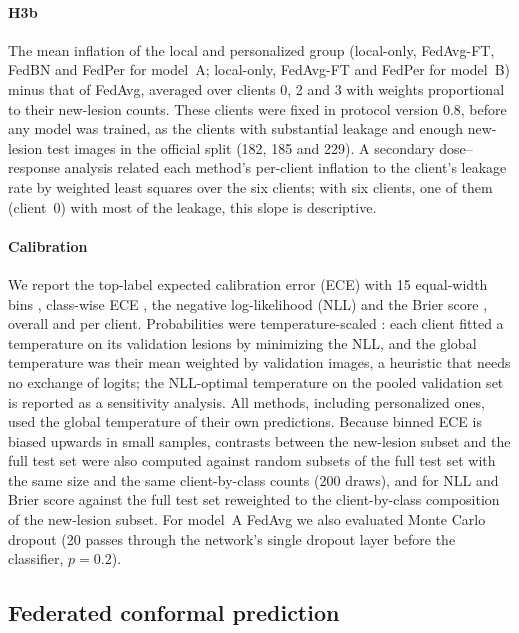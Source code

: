 \documentclass[VANCOUVER,Times1COL]{WileyNJDv5}
\begin{document}
\paragraph{H3b} The mean inflation of the local and personalized group (local-only, FedAvg-FT, FedBN
and FedPer for model~A; local-only, FedAvg-FT and FedPer for model~B) minus that of FedAvg, averaged over
clients 0, 2 and 3 with weights proportional to their new-lesion counts. These clients were fixed in
protocol version 0.8, before any model was trained, as the clients with substantial leakage and enough
new-lesion test images in the official split (182, 185 and 229). A secondary dose--response analysis related each
method's per-client inflation to the client's leakage rate by weighted least squares over the six clients;
with six clients, one of them (client~0) with most of the leakage, this slope is descriptive.

\paragraph{Calibration} We report the top-label expected calibration error (ECE) with 15 equal-width
bins \cite{naeini2015ece,guo2017calibration}, class-wise ECE \cite{kull2019beyond}, the negative
log-likelihood (NLL) and the Brier score \cite{brier1950}, overall and per client. Probabilities were
temperature-scaled \cite{guo2017calibration}: each client fitted a temperature on its validation lesions
by minimizing the NLL, and the global temperature was their mean weighted by validation images, a
heuristic that needs no exchange of logits; the NLL-optimal temperature on the pooled validation set is
reported as a sensitivity analysis. All methods, including personalized ones, used the global temperature
of their own predictions. Because binned ECE is biased upwards in small samples, contrasts between the
new-lesion subset and the full test set were also computed against random subsets of the full test set
with the same size and the same client-by-class counts (200 draws), and for NLL and Brier score against
the full test set reweighted to the client-by-class composition of the new-lesion subset. For model~A
FedAvg we also evaluated Monte Carlo dropout \cite{gal2016dropout} (20 passes through the network's single
dropout layer before the classifier, $p=0.2$).

\subsection{Federated conformal prediction}
\label{sec:conformal}
\end{document}
